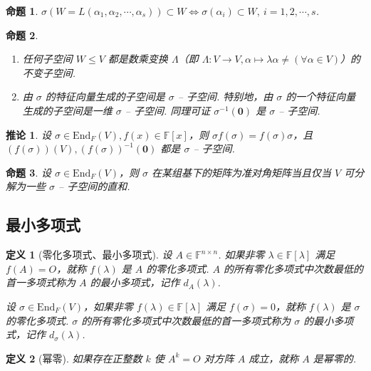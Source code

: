 \documentclass[zihao=-4,UTF8,linespread=1.8,nothm]{aytony_base}
\newtheorem{proposition}{\indent 命题}[subsection]
\newtheorem*{corollary}{\indent 推论}
\newtheorem{definition}{\indent 定义}[subsection]
\begin{document}
\begin{proposition}
    $\sigma(W = L({\alpha}_1, {\alpha}_2, \cdots, {\alpha}_{s})) \subset W \Leftrightarrow \sigma(\alpha_i) \subset W,\ i = 1, 2, \cdots, s$.
\end{proposition}

\begin{proposition}
    \begin{enumerate}[nosep]
        \item 任何子空间 $W \leqslant V$ 都是数乘变换 $\Lambda$（即 $\Lambda:V \to V, \alpha \mapsto \lambda\alpha \neq (\forall \alpha \in V)$）的不变子空间.
        \item 由 $\sigma$ 的特征向量生成的子空间是 $\sigma$ -- 子空间. 特别地，由 $\sigma$ 的一个特征向量生成的子空间是一维 $\sigma$ -- 子空间. 同理可证 $\sigma^{-1}(\mathbf{0})$ 是 $\sigma$ -- 子空间.
    \end{enumerate}
\end{proposition}

\begin{corollary}
    设 $\sigma \in \mathrm{End}_F(V), f(x) \in \mathbb{F}[x]$，则 $\sigma f(\sigma) = f(\sigma) \sigma$，且 $(f(\sigma))(V), (f(\sigma))^{-1}(\mathbf{0})$ 都是 $\sigma$ -- 子空间.
\end{corollary}

\begin{proposition}
    设 $\sigma \in \mathrm{End}_F(V)$，则 $\sigma$ 在某组基下的矩阵为准对角矩阵当且仅当 $V$ 可分解为一些 $\sigma$ -- 子空间的直和.
\end{proposition}

\subsection{最小多项式}

\begin{definition}[零化多项式、最小多项式]
    设 $A \in \mathbb{F}^{n \times n}$. 如果非零 $\lambda \in \mathbb{F}[\lambda]$ 满足 $f(A) = O$，就称 $f(\lambda)$ 是 $A$ 的零化多项式. $A$ 的所有零化多项式中次数最低的首一多项式称为 $A$ 的最小多项式，记作 $d_A(\lambda)$.

    设 $\sigma \in \mathrm{End}_F(V)$，如果非零 $f(\lambda) \in \mathbb{F}[\lambda]$ 满足 $f(\sigma) = 0$，就称 $f(\lambda)$ 是 $\sigma$ 的零化多项式. $\sigma$ 的所有零化多项式中次数最低的首一多项式称为 $\sigma$ 的最小多项式，记作 $d_{\sigma}(\lambda)$.
\end{definition}

\begin{definition}[幂零]
    如果存在正整数 $k$ 使 $A^k = O$ 对方阵 $A$ 成立，就称 $A$ 是幂零的.
\end{definition}
\end{document}
